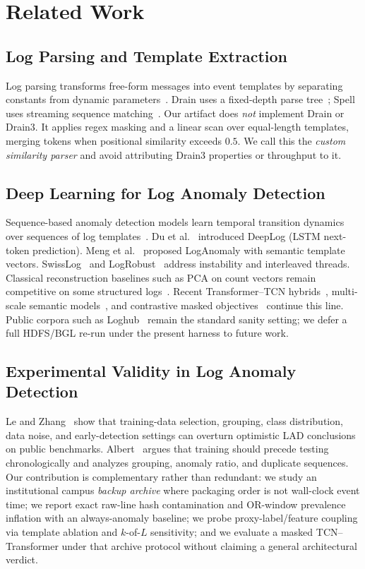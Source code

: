 \documentclass[a4paper]{llncs}
\begin{document}
\section{Related Work}
\subsection{Log Parsing and Template Extraction}
Log parsing transforms free-form messages into event templates by separating constants from dynamic parameters~\cite{ref_drain3,ref_spell}. Drain uses a fixed-depth parse tree~\cite{ref_drain3}; Spell uses streaming sequence matching~\cite{ref_spell}. Our artifact does \emph{not} implement Drain or Drain3. It applies regex masking and a linear scan over equal-length templates, merging tokens when positional similarity exceeds $0.5$. We call this the \emph{custom similarity parser} and avoid attributing Drain3 properties or throughput to it.

\subsection{Deep Learning for Log Anomaly Detection}
Sequence-based anomaly detection models learn temporal transition dynamics over sequences of log templates~\cite{ref_deeplog,ref_loganomaly,ref_pca}. Du et al.~\cite{ref_deeplog} introduced DeepLog (LSTM next-token prediction). Meng et al.~\cite{ref_loganomaly} proposed LogAnomaly with semantic template vectors. SwissLog~\cite{ref_swisslog} and LogRobust~\cite{ref_logrobust} address instability and interleaved threads. Classical reconstruction baselines such as PCA on count vectors remain competitive on some structured logs~\cite{ref_pca}. Recent Transformer--TCN hybrids~\cite{ref_tranconvad}, multi-scale semantic models~\cite{ref_logmuse_2026}, and contrastive masked objectives~\cite{ref_contralog_2026} continue this line. Public corpora such as Loghub~\cite{ref_loghub} remain the standard sanity setting; we defer a full HDFS/BGL re-run under the present harness to future work.

\subsection{Experimental Validity in Log Anomaly Detection}
Le and Zhang~\cite{ref_le_zhang_2022} show that training-data selection, grouping, class distribution, data noise, and early-detection settings can overturn optimistic LAD conclusions on public benchmarks. Albert~\cite{ref_albert_2025} argues that training should precede testing chronologically and analyzes grouping, anomaly ratio, and duplicate sequences. Our contribution is complementary rather than redundant: we study an institutional campus \emph{backup archive} where packaging order is not wall-clock event time; we report exact raw-line hash contamination and OR-window prevalence inflation with an always-anomaly baseline; we probe proxy-label/feature coupling via template ablation and $k$-of-$L$ sensitivity; and we evaluate a masked TCN--Transformer under that archive protocol without claiming a general architectural verdict.
\end{document}
